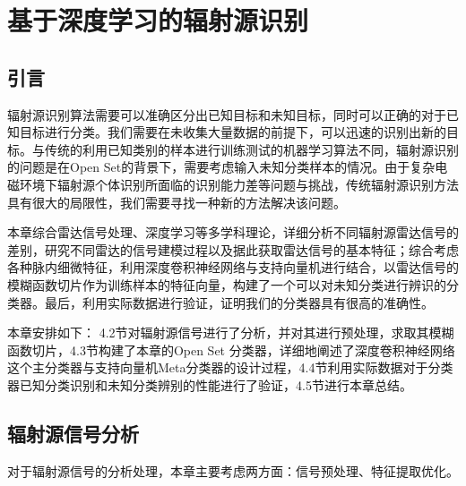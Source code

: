 \chapter{基于深度学习的辐射源识别}




\section{引言}

辐射源识别算法需要可以准确区分出已知目标和未知目标，同时可以正确的对于已知目标进行分类。我们需要在未收集大量数据的前提下，可以迅速的识别出新的目标。与传统的利用已知类别的样本进行训练测试的机器学习算法不同，辐射源识别的问题是在Open Set的背景下，需要考虑输入未知分类样本的情况。由于复杂电磁环境下辐射源个体识别所面临的识别能力差等问题与挑战，传统辐射源识别方法具有很大的局限性，我们需要寻找一种新的方法解决该问题。

本章综合雷达信号处理、深度学习等多学科理论，详细分析不同辐射源雷达信号的差别，研究不同雷达的信号建模过程以及据此获取雷达信号的基本特征；综合考虑各种脉内细微特征，利用深度卷积神经网络与支持向量机进行结合，以雷达信号的模糊函数切片作为训练样本的特征向量，构建了一个可以对未知分类进行辨识的分类器。最后，利用实际数据进行验证，证明我们的分类器具有很高的准确性。

本章安排如下： 4.2节对辐射源信号进行了分析，并对其进行预处理，求取其模糊函数切片，4.3节构建了本章的Open Set 分类器，详细地阐述了深度卷积神经网络这个主分类器与支持向量机Meta分类器的设计过程，4.4节利用实际数据对于分类器已知分类识别和未知分类辨别的性能进行了验证，4.5节进行本章总结。


\section{辐射源信号分析}
对于辐射源信号的分析处理，本章主要考虑两方面：信号预处理、特征提取优化。

